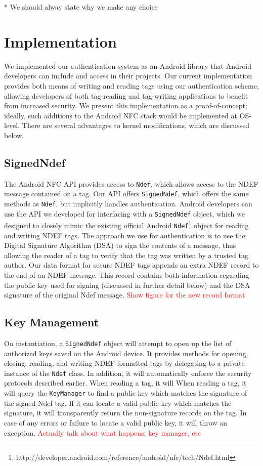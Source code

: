 \documentclass[12pt]{article}
\newcommand\TODO[1]{\textcolor{red}{#1}}
\begin{document}
* We should alway state why we make any choice

\section{Implementation}
We implemented our authentication system as an Android library that Android developers can include and access in their projects.
Our current implementation provides both means of writing and reading tags using our authentication scheme, allowing developers of both tag-reading and tag-writing applications to benefit from increased security.
We present this implementation as a proof-of-concept; ideally, such additions to the Android NFC stack would be implemented at OS-level.
There are several advantages to kernel modifications, which are discussed below.

\subsection{SignedNdef}
The Android NFC API provides access to \texttt{Ndef}, which allows access to the NDEF message contained on a tag.
Our API offers \texttt{SignedNdef}, which offers the same methods as \texttt{Ndef}, but implicitly handles authentication.
Android developers can use the API we developed for interfacing with a \texttt{SignedNdef} object, which we designed to closely mimic the existing official Android \texttt{Ndef}\footnote{http://developer.android.com/reference/android/nfc/tech/Ndef.html} object for reading and writing NDEF tags.
The approach we use for authentication is to use the Digital Signature Algorithm (DSA) to sign the contents of a message, thus allowing the reader of a tag to verify that the tag was written by a trusted tag author.
Our data format for secure NDEF tags appends an extra NDEF record to the end of an NDEF message.
This record contains both information regarding the public key used for signing (discussed in further detail below) and the DSA signature of the original Ndef message.
\TODO{Show figure for the new record format}

\subsection{Key Management}

On instantiation, a \texttt{SignedNdef} object will attempt to open up the list of authorized keys saved on the Android device.
It provides methods for opening, closing, reading, and writing NDEF-formatted tags by delegating to a private instance of the \texttt{Ndef} class.
In addition, it will automatically enforce the security protocols described earlier.
When reading a tag, it will 
When reading a tag, it will query the \texttt{KeyManager} to find a public key which matches the signature of the signed Ndef tag.
If it can locate a valid public key which matches the signature, it will transparently return the non-signature records on the tag.
In case of any errors or failure to locate a valid public key, it will throw an exception. \TODO{Actually talk about what happens; key manager, etc}
\end{document}
